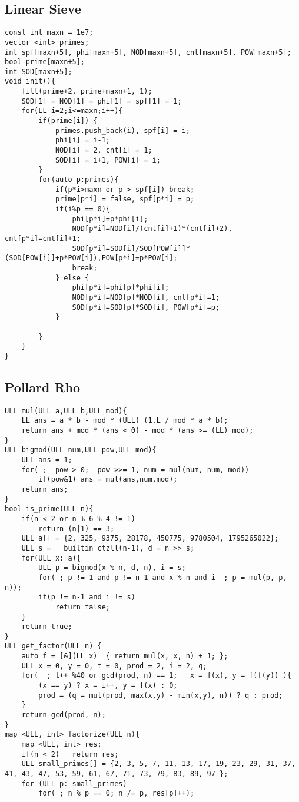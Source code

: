 \documentclass[FSZ,a4paper,onesided]{article}
\begin{document}
\begin{multicols*}{\COLS}
\subsection{Linear Sieve}
\begin{lstlisting}
const int maxn = 1e7;
vector <int> primes;
int spf[maxn+5], phi[maxn+5], NOD[maxn+5], cnt[maxn+5], POW[maxn+5]; 
bool prime[maxn+5];
int SOD[maxn+5];
void init(){
    fill(prime+2, prime+maxn+1, 1);
    SOD[1] = NOD[1] = phi[1] = spf[1] = 1;
    for(LL i=2;i<=maxn;i++){
        if(prime[i]) {
            primes.push_back(i), spf[i] = i;
            phi[i] = i-1;
            NOD[i] = 2, cnt[i] = 1;
            SOD[i] = i+1, POW[i] = i;
        }
        for(auto p:primes){
            if(p*i>maxn or p > spf[i]) break;
            prime[p*i] = false, spf[p*i] = p;
            if(i%p == 0){
                phi[p*i]=p*phi[i];
                NOD[p*i]=NOD[i]/(cnt[i]+1)*(cnt[i]+2), cnt[p*i]=cnt[i]+1;
                SOD[p*i]=SOD[i]/SOD[POW[i]]*(SOD[POW[i]]+p*POW[i]),POW[p*i]=p*POW[i];
                break;
            } else {
                phi[p*i]=phi[p]*phi[i];
                NOD[p*i]=NOD[p]*NOD[i], cnt[p*i]=1;
                SOD[p*i]=SOD[p]*SOD[i], POW[p*i]=p;
            }

        }
    }
}

\end{lstlisting}
\subsection{Pollard Rho}
\begin{lstlisting}
ULL mul(ULL a,ULL b,ULL mod){
    LL ans = a * b - mod * (ULL) (1.L / mod * a * b);
    return ans + mod * (ans < 0) - mod * (ans >= (LL) mod);
}
ULL bigmod(ULL num,ULL pow,ULL mod){
    ULL ans = 1;
    for( ;  pow > 0;  pow >>= 1, num = mul(num, num, mod))
        if(pow&1) ans = mul(ans,num,mod);
    return ans;
}
bool is_prime(ULL n){
    if(n < 2 or n % 6 % 4 != 1) 
        return (n|1) == 3;
    ULL a[] = {2, 325, 9375, 28178, 450775, 9780504, 1795265022};
    ULL s = __builtin_ctzll(n-1), d = n >> s;
    for(ULL x: a){
        ULL p = bigmod(x % n, d, n), i = s;
        for( ; p != 1 and p != n-1 and x % n and i--; p = mul(p, p, n));
        if(p != n-1 and i != s)
            return false;
    }
    return true;
}
ULL get_factor(ULL n) {
    auto f = [&](LL x)  { return mul(x, x, n) + 1; };
    ULL x = 0, y = 0, t = 0, prod = 2, i = 2, q;
    for(  ; t++ %40 or gcd(prod, n) == 1;   x = f(x), y = f(f(y)) ){
        (x == y) ? x = i++, y = f(x) : 0;
        prod = (q = mul(prod, max(x,y) - min(x,y), n)) ? q : prod;
    }
    return gcd(prod, n);
}
map <ULL, int> factorize(ULL n){
    map <ULL, int> res;
    if(n < 2)   return res;
    ULL small_primes[] = {2, 3, 5, 7, 11, 13, 17, 19, 23, 29, 31, 37, 41, 43, 47, 53, 59, 61, 67, 71, 73, 79, 83, 89, 97 };
    for (ULL p: small_primes)
        for( ; n % p == 0; n /= p, res[p]++);


\end{lstlisting}
\end{multicols*}
\end{document}
